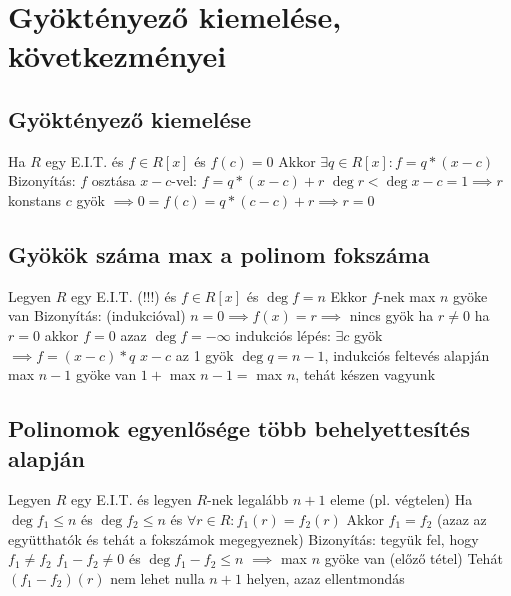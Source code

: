 \documentclass[12pt,a4paper]{article}
\begin{document}
\pagebreak

\section{Gyöktényező kiemelése, következményei}

\subsection{Gyöktényező kiemelése}

\begin{outline}
	\1 Ha $R$ egy E.I.T. és $f \in R[x]$ és $f(c)=0$
	\1 Akkor $\exists q \in R[x]: f = q*(x-c)$
	\1 Bizonyítás:
		\2 $f$ osztása $x-c$-vel: $f = q*(x-c)+r$
		\2 $\deg r < \deg x-c = 1 \implies r$ konstans
		\2 $c$ gyök $\implies 0=f(c)=q*(c-c)+r \implies r=0$
\end{outline}

\subsection{Gyökök száma max a polinom fokszáma}

\begin{outline}
	\1 Legyen $R$ egy E.I.T. (!!!) és $f \in R[x]$ és $\deg f = n$
	\1 Ekkor $f$-nek max $n$ gyöke van
	\1 Bizonyítás: (indukcióval)
		\2 $n=0 \implies f(x)=r \implies $ nincs gyök ha $r \ne 0$
			\3 ha $r = 0$ akkor $f=0$ azaz $\deg f = -\infty$
		\2 indukciós lépés: $\exists c$ gyök $\implies f=(x-c)*q$
			\3 $x-c$ az 1 gyök
			\3 $\deg q = n-1$, indukciós feltevés alapján max $n-1$ gyöke van
			\3 $1+$ max $n-1=$ max $n$, tehát készen vagyunk
\end{outline}

\subsection{Polinomok egyenlősége több behelyettesítés alapján}

\begin{outline}
	\1 Legyen $R$ egy E.I.T. és legyen $R$-nek legalább $n+1$ eleme (pl. végtelen)
	\1 Ha $\deg f_1 \le n$ és $\deg f_2 \le n$ és $\forall r \in R: f_1(r) = f_2(r)$
	\1 Akkor $f_1 = f_2$ (azaz az együtthatók és tehát a fokszámok megegyeznek)
	\1 Bizonyítás: tegyük fel, hogy $f_1 \ne f_2$
		\2 $f_1 - f_2 \ne 0$ és $\deg f_1 - f_2 \le n$ $\implies$ max $n$ gyöke van (előző tétel)
		\2 Tehát $(f_1-f_2)(r)$ nem lehet nulla $n+1$ helyen, azaz ellentmondás
\end{outline}
\end{document}
